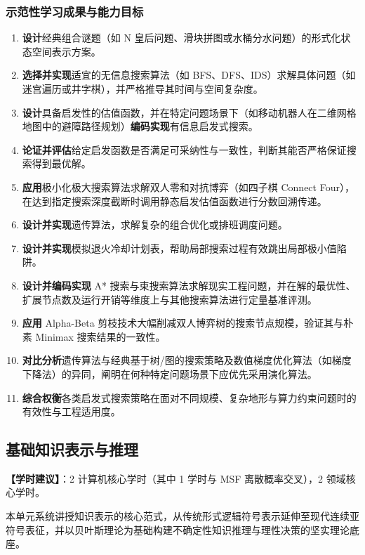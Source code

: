 \subsubsection{示范性学习成果与能力目标}
\begin{enumerate}
    \item \textbf{设计}经典组合谜题（如 N 皇后问题、滑块拼图或水桶分水问题）的形式化状态空间表示方案。
    \item \textbf{选择并实现}适宜的无信息搜索算法（如 BFS、DFS、IDS）求解具体问题（如迷宫遍历或井字棋），并严格推导其时间与空间复杂度。
    \item \textbf{设计}具备启发性的估值函数，并在特定问题场景下（如移动机器人在二维网格地图中的避障路径规划）\textbf{编码实现}有信息启发式搜索。
    \item \textbf{论证并评估}给定启发函数是否满足可采纳性与一致性，判断其能否严格保证搜索得到最优解。
    \item \textbf{ 应用}极小化极大搜索算法求解双人零和对抗博弈（如四子棋 Connect Four），在达到指定搜索深度截断时调用静态启发估值函数进行分数回溯传递。
    \item \textbf{设计并实现}遗传算法，求解复杂的组合优化或排班调度问题。
    \item \textbf{设计并实现}模拟退火冷却计划表，帮助局部搜索过程有效跳出局部极小值陷阱。
    \item \textbf{设计并编码实现} A* 搜索与束搜索算法求解现实工程问题，并在解的最优性、扩展节点数及运行开销等维度上与其他搜索算法进行定量基准评测。
    \item \textbf{应用} Alpha-Beta 剪枝技术大幅削减双人博弈树的搜索节点规模，验证其与朴素 Minimax 搜索结果的一致性。
    \item \textbf{对比分析}遗传算法与经典基于树/图的搜索策略及数值梯度优化算法（如梯度下降法）的异同，阐明在何种特定问题场景下应优先采用演化算法。
    \item \textbf{综合权衡}各类启发式搜索策略在面对不同规模、复杂地形与算力约束问题时的有效性与工程适用度。
\end{enumerate}

\subsection{基础知识表示与推理}
\textbf{【学时建议】}：2 计算机核心学时（其中 1 学时与 MSF 离散概率交叉），2 领域核心学时。

本单元系统讲授知识表示的核心范式，从传统形式逻辑符号表示延伸至现代连续亚符号表征，并以贝叶斯理论为基础构建不确定性知识推理与理性决策的坚实理论底座。

